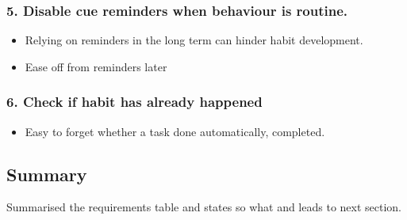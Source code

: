 \subsubsection*{5. Disable cue reminders when behaviour is routine.}
  \begin{itemize}
    \item Relying on reminders in the long term can hinder habit development.
    \item Ease off from reminders later
  \end{itemize}

\subsubsection*{6. Check if habit has already happened}
  \begin{itemize}
    \item Easy to forget whether a task done automatically, completed.
  \end{itemize}


\subsection*{Summary}
Summarised the requirements table and states so what and leads to next section.

